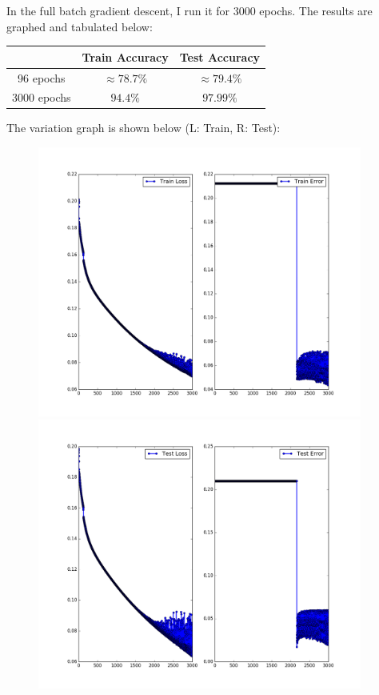 \documentclass{article}
\begin{document}
\begin{flushleft}
In the full batch gradient descent, I run it for 3000 epochs. The results are graphed and tabulated below:
\begin{center}
\begin{tabular}{|c|c|c|}
\hline
& Train Accuracy & Test Accuracy \\
\hline
\hline
96 epochs & \(\approx 78.7\%\) & \(\approx 79.4\%\) \\
\hline
3000 epochs & \(94.4\%\) & \(97.99\%\) \\
\hline
\end{tabular}
\end{center}

The variation graph is shown below (L: Train, R: Test):
\begin{figure}[H]
\begin{minipage}{0.49\linewidth}
\centering
\includegraphics[width=0.95\textwidth]{Train-Statistics-sgd-batchsize=8143-mse.png}
\end{minipage}
\hfill
\begin{minipage}{0.49\linewidth}
\centering
\includegraphics[width=0.95\textwidth]{Test-Statistics-sgd-batchsize=8143-mse.png}
\end{minipage}
\end{figure}


\end{flushleft}
\end{document}
